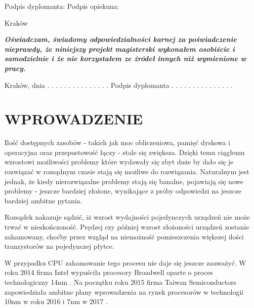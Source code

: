\documentclass[12pt,a4paper,twoside]{article}
\begin{document}
\begin{center}
Podpis dyplomanta: \hspace{150pt} Podpis opiekuna:

\vspace{72pt}
Kraków \@date
\end{center}

\newpage
{} %
\setcounter{page}{2} %

\textit{
\textbf{ Oświadczam, świadomy odpowiedzialności karnej za poświadczenie nieprawdy, że niniejszy projekt magisterski wykonałem osobiście i samodzielnie i że nie korzystałem ze źródeł innych niż wymienione w pracy.
}}

\vspace{33pt}

\noindent
Kraków, dnia  . . . . . . . . .	. . . . . . 
\hspace{108pt} 
Podpis dyplomanta  . . . . . . . . . . . . . . . 

\newpage

\tableofcontents

\newpage

\section{WPROWADZENIE}


Ilość dostępnych zasobów - takich jak moc obliczeniowa, pamięć dyskowa i operacyjna oraz przepustowość łączy - stale się zwiększa. Dzięki temu ciągłemu wzrostowi możliwości problemy które wydawały się zbyt duże by dało się je rozwiązać w rozsądnym czasie stają się możliwe do rozwiązania. Naturalnym jest jednak, że kiedy nierozwiązalne problemy stają się banalne, pojawiają się nowe problemy - jeszcze bardziej złożone, wynikające z próby odpowiedzi na jeszcze bardziej ambitne pytania.


Rozsądek nakazuje sądzić, iż wzrost wydajności pojedynczych urządzeń nie może trwać w nieskończoność. Prędzej czy później wzrost złożoności urządzeń zostanie zahamowany, choćby przez wzgląd na niemożność pomieszczenia większej ilości tranzystorów na pojedynczej płytce. 

W przypadku CPU zahamowanie tego procesu nie daje się jeszcze zauważyć. W roku 2014 firma Intel wypuściła procesory Broadwell oparte o proces technologiczny 14nm \cite{intel14nm}. Na początku roku 2015 firma Taiwan Semiconductors zapowiedziała ambitne plany wprowadzenia na rynek procesorów w technologii 10nm w roku 2016 i 7nm w 2017 \cite{tsmc}.
\end{document}
